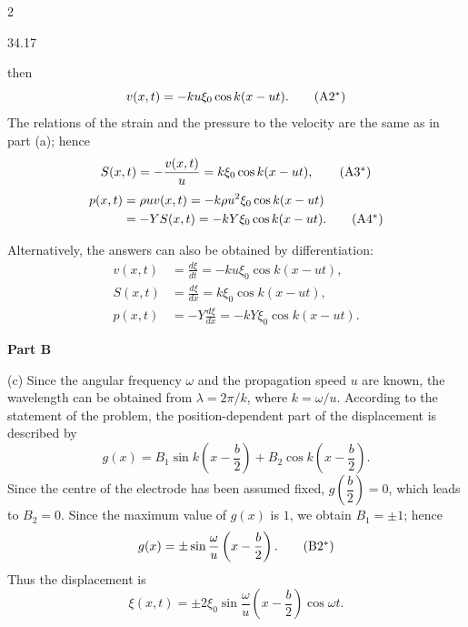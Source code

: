 \begin{solution}{2}
\begin{figbox}{34.17}
\end{figbox}

then
\begin{equation}
v(x,t)=-ku\xi_0\cos k(x-ut). \tag{A2$^{*}$}
\end{equation}
The relations of the strain and the pressure to the velocity are the same as in part (a); hence
\begin{equation}
S(x,t)=-\frac{v(x,t)}{u}=k\xi_0\cos k(x-ut), \tag{A3$^{*}$}
\end{equation}
\begin{align}
p(x,t)&=\rho uv(x,t)=-k\rho u^2\xi_0\cos k(x-ut)\notag\\
&=-YS(x,t)=-kY\xi_0\cos k(x-ut). \tag{A4$^{*}$}
\end{align}

Alternatively, the answers can also be obtained by differentiation:
\begin{align*}
v(x,t)&=\frac{d\xi}{dt}=-ku\xi_0\cos k(x-ut),\\
S(x,t)&=\frac{d\xi}{dx}=k\xi_0\cos k(x-ut),\\
p(x,t)&=-Y\frac{d\xi}{dx}=-kY\xi_0\cos k(x-ut).
\end{align*}

\textbf{Part B}

(c) Since the angular frequency $\omega$ and the propagation speed $u$ are known, the wavelength can be obtained from $\lambda=2\pi/k$, where $k=\omega/u$. According to the statement of the problem, the position-dependent part of the displacement is described by
\begin{equation}
g(x)=B_1\sin k\left(x-\frac{b}{2}\right)+B_2\cos k\left(x-\frac{b}{2}\right). \tag{B1}
\end{equation}
Since the centre of the electrode has been assumed fixed, $g\left(\dfrac{b}{2}\right)=0$, which leads to $B_2=0$. Since the maximum value of $g(x)$ is $1$, we obtain $B_1=\pm1$; hence
\begin{equation}
g(x)=\pm\sin\frac{\omega}{u}\left(x-\frac{b}{2}\right). \tag{B2$^{*}$}
\end{equation}
Thus the displacement is
\begin{equation}
\xi(x,t)=\pm2\xi_0\sin\frac{\omega}{u}\left(x-\frac{b}{2}\right)\cos\omega t . \tag{B3}
\end{equation}


\end{solution}
